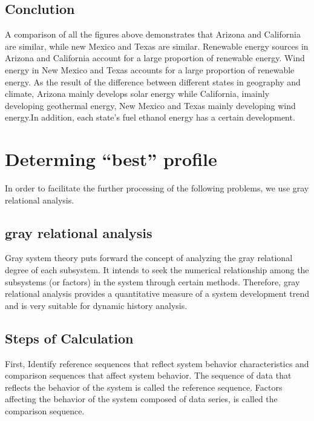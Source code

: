 \documentclass{mcmthesis}
\begin{document}
\subsection{Conclution}
A comparison of all the figures above demonstrates that Arizona and California are similar, while new Mexico and Texas are similar. Renewable energy sources in Arizona and California account for a large proportion of renewable energy. Wind energy in New Mexico and Texas accounts for a large proportion of renewable energy. As the result of the difference between different states in geography and climate, Arizona mainly develops solar energy while California, imainly developing geothermal energy,  New Mexico and Texas mainly developing wind energy.In addition, each state's fuel ethanol energy has a certain development.

\section{Determing ``best'' profile}
In order to facilitate the further processing of the following problems, we use gray relational analysis.
\subsection{gray relational analysis}
Gray system theory puts forward the concept of analyzing the gray relational degree of each subsystem. It intends to seek the numerical relationship among the subsystems (or factors) in the system through certain methods.
Therefore, gray relational analysis provides a quantitative measure of a system development trend and is very suitable for dynamic history analysis.\cite{AZretime}

\subsection{Steps of Calculation}
First, Identify reference sequences that reflect system behavior characteristics and comparison sequences that affect system behavior.
The sequence of data that reflects the behavior of the system is called the reference sequence. Factors affecting the behavior of the system composed of data series, is called the comparison sequence.
\end{document}
